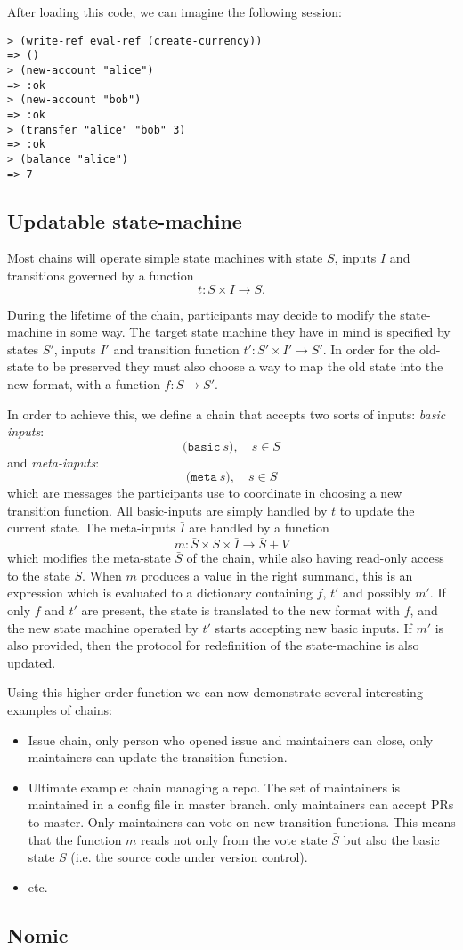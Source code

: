 

After loading this code, we can imagine the following \rad{} session:
\begin{Verbatim}[fontsize=\small]
> (write-ref eval-ref (create-currency))
=> ()
> (new-account "alice")
=> :ok
> (new-account "bob")
=> :ok
> (transfer "alice" "bob" 3)
=> :ok
> (balance "alice")
=> 7
\end{Verbatim}

\subsection{Updatable state-machine}

Most chains will operate simple state machines with state $S$, inputs $I$ and
transitions governed by a function
\[
t \colon S \times I \to S.
\]

During the lifetime of the chain, participants may decide to modify the
state-machine in some way. The target state machine they have in mind is
specified by states $S'$, inputs $I'$ and transition function $t' \colon S'
\times I' \to S'$. In order for the old-state to be preserved they must also
choose a way to map the old state into the new format, with a function $f \colon
S \to S'$.

In order to achieve this, we define a chain that accepts two sorts of inputs:
\emph{basic inputs}:
\[
\mathtt{(basic} \ s), \quad s \in S
\]
and \emph{meta-inputs}:
\[
\mathtt{(meta} \ s), \quad s \in S
\]
which are messages the participants use to coordinate in choosing a new
transition function. All basic-inputs are simply handled by $t$ to update the
current state. The meta-inputs $\bar I$ are handled by a function
\[
m \colon \bar S \times S \times \bar I \to \bar S + V
\]
which modifies the meta-state $\bar S$ of the chain, while also having read-only
access to the state $S$. When $m$ produces a value in the right summand, this is
an expression which is evaluated to a dictionary containing $f$, $t'$ and
possibly $m'$. If only $f$ and $t'$ are present, the state is translated to the
new format with $f$, and the new state machine operated by $t'$ starts accepting
new basic inputs. If $m'$ is also provided, then the protocol for redefinition
of the state-machine is also updated.

Using this higher-order function we can now demonstrate several interesting
examples of chains:
\begin{itemize}
\item Issue chain, only person who opened issue and maintainers can close, only
  maintainers can update the transition function.
\item Ultimate example: chain managing a repo. The set of maintainers is
  maintained in a config file in master branch. only maintainers can accept PRs
  to master. Only maintainers can vote on new transition functions. This means
  that the function $m$ reads not only from the vote state $\bar S$ but also the
  basic state $S$ (i.e. the source code under version control).
\item etc.
\end{itemize}

\subsection{Nomic}
\label{s:examples}

